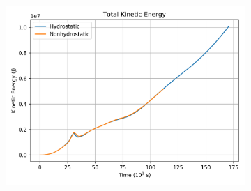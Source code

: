 \documentclass[11pt]{article}
\begin{document}
\clearpage
\begin{figure}[h!]
\centering
\begin{subfigure}{0.98\linewidth}
\includegraphics[width=\linewidth]{solarForcing/convect-deltaTKE}
\end{subfigure}


\end{figure}
\end{document}
